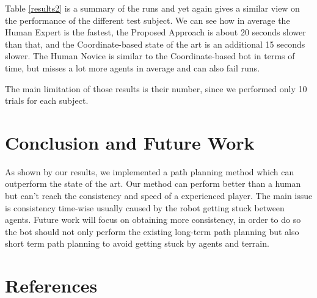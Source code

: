 \documentclass[]{article}
\begin{document}
Table \ref{results2} is a summary of the runs and yet again gives a similar view on the performance of the different test subject. We can see how in average the Human Expert is the fastest, the Proposed Approach is about 20 seconds slower than that, and the Coordinate-based state of the art is an additional 15 seconds slower. The Human Novice is similar to the Coordinate-based bot in terms of time, but misses a lot more agents in average and can also fail runs.

The main limitation of those results is their number, since we performed only 10 trials for each subject.

\section{Conclusion and Future Work}
As shown by our results, we implemented a path planning method which can outperform the state of the art. Our method can perform better than a human but can't reach the consistency and speed of a experienced player. The main issue is consistency time-wise usually caused by the robot getting stuck between agents. Future work will focus on obtaining more consistency, in order to do so the bot should not only perform the existing long-term path planning but also short term path planning to avoid getting stuck by agents and terrain.

\section{References}



\end{document}
